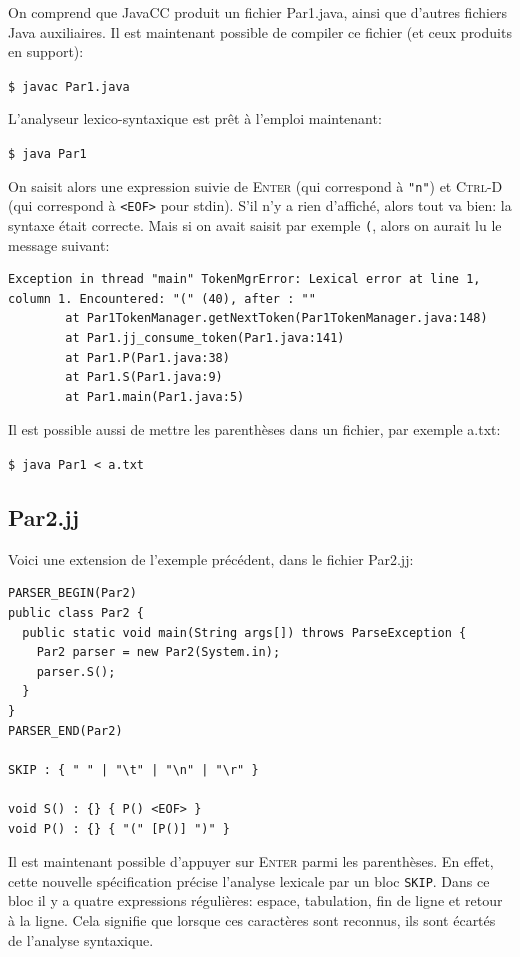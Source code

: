 \documentclass[11pt,a4paper]{article}
\newcommand{\Java}{\textsf{Java}\xspace}
\newcommand{\JavaCC}{\textsf{JavaCC}\xspace}
\newcommand{\str}[1]{\texttt{"{#1}"}}
\begin{document}
\noindent
On comprend que \JavaCC produit un fichier \textsf{Par1.java},
ainsi que d'autres fichiers \Java auxiliaires. Il est maintenant
possible de compiler ce fichier (et ceux produits en support):

\noindent \verb+$ javac Par1.java+

\noindent L'analyseur lexico-syntaxique est prêt à l'emploi maintenant:

\noindent \verb+$ java Par1+

\noindent On saisit alors une expression suivie de
\textsf{\textsc{Enter}} (qui correspond à \str{n}) et
\textsf{\textsc{Ctrl-D}} (qui correspond à \texttt{<EOF>} pour
\textsf{stdin}). S'il n'y a rien d'affiché, alors tout va bien: la
syntaxe était correcte. Mais si on avait saisit par exemple \verb+(+,
alors on aurait lu le message suivant:

{\small
\begin{verbatim}
Exception in thread "main" TokenMgrError: Lexical error at line 1,
column 1. Encountered: "(" (40), after : ""
        at Par1TokenManager.getNextToken(Par1TokenManager.java:148)
        at Par1.jj_consume_token(Par1.java:141)
        at Par1.P(Par1.java:38)
        at Par1.S(Par1.java:9)
        at Par1.main(Par1.java:5)
\end{verbatim}
}

\noindent Il est possible aussi de mettre les parenthèses dans un
fichier, par exemple \textsf{a.txt}:

\noindent \verb+$ java Par1 < a.txt+

\subsection{Par2.jj}

\noindent
Voici une extension de l'exemple précédent, dans le fichier
\textsf{Par2.jj}:

{\small
\begin{verbatim}
PARSER_BEGIN(Par2)
public class Par2 {
  public static void main(String args[]) throws ParseException {
    Par2 parser = new Par2(System.in);
    parser.S();
  }
}
PARSER_END(Par2)

SKIP : { " " | "\t" | "\n" | "\r" }

void S() : {} { P() <EOF> }
void P() : {} { "(" [P()] ")" }
\end{verbatim}
}

\noindent Il est maintenant possible d'appuyer sur
\textsf{\textsc{Enter}} parmi les parenthèses. En effet, cette
nouvelle spécification précise l'analyse lexicale par un bloc
\texttt{SKIP}. Dans ce bloc il y a quatre expressions régulières:
espace, tabulation, fin de ligne et retour à la ligne. Cela signifie
que lorsque ces caractères sont reconnus, ils sont écartés de
l'analyse syntaxique.
\end{document}
